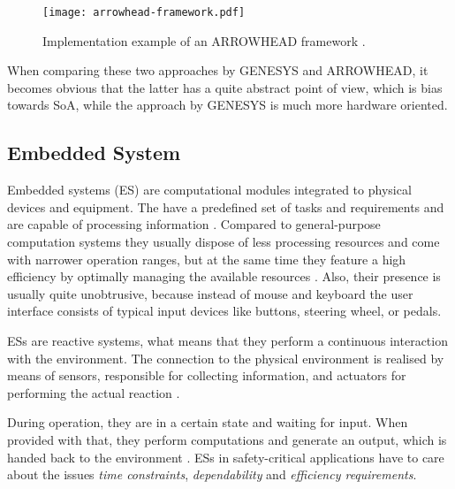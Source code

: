 \begin{figure}[!htbp]
\centering
\texttt{[image: arrowhead-framework.pdf]}
\caption{Implementation example of an ARROWHEAD framework \cite{arrowhead:presentation}.}
\label{fig:arrowhead-framework}
\end{figure}

When comparing these two approaches by GENESYS and ARROWHEAD, it becomes obvious that the latter has a quite abstract point of view, which is bias towards SoA, while the approach by GENESYS is much more hardware oriented.



\subsection{Embedded System}
\label{sec:embedded_system}

Embedded systems (ES) are computational modules integrated to physical devices and equipment. The have a predefined set of tasks and requirements and are capable of processing information \cite{rodrigues2011} \cite[p.xiii]{marwedel}. Compared to general-purpose computation systems they usually dispose of less processing resources and come with narrower operation ranges, but at the same time they feature a high efficiency by optimally managing the available resources \cite[p.283]{alippi} \cite[p.5]{marwedel}. Also, their presence is usually quite unobtrusive, because instead of mouse and keyboard the user interface consists of typical input devices like buttons, steering wheel, or pedals.

ESs are reactive systems, what means that they perform a continuous interaction with the environment. The connection to the physical environment is realised by means of sensors, responsible for collecting information, and actuators for performing the actual reaction \cite[p.8-9]{marwedel}. 

During operation, they are in a certain state and waiting for input. When provided with that, they perform computations and generate an output, which is handed back to the environment \cite[p.9]{marwedel}. ESs in safety-critical applications have to care about the issues \emph{time constraints}, \emph{dependability} and \emph{efficiency requirements}.

